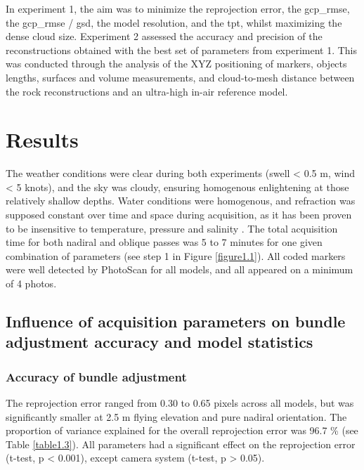 In experiment 1, the aim was to minimize the reprojection error, the \acrshort{gcp_rmse}, the \acrshort{gcp_rmse} / \acrshort{gsd}, the model resolution, and the \acrshort{tpt}, whilst maximizing the dense cloud size. Experiment 2 assessed the accuracy and precision of the reconstructions obtained with the best set of parameters from experiment 1. This was conducted through the analysis of the XYZ positioning of markers, objects lengths, surfaces and volume measurements, and cloud-to-mesh distance between the rock reconstructions and an ultra-high in-air reference model.

\section[Results]{Results}\label{chapitre1_3}
The weather conditions were clear during both experiments (swell < 0.5 m, wind < 5 knots), and the sky was cloudy, ensuring homogenous enlightening at those relatively shallow depths. Water conditions were homogenous, and refraction was supposed constant over time and space during acquisition, as it has been proven to be insensitive to temperature, pressure and salinity \citep{moore_underwater_1976}. The total acquisition time for both nadiral and oblique passes was 5 to 7 minutes for one given combination of parameters (see step 1 in Figure \ref{figure1.1}). All coded markers were well detected by PhotoScan for all models, and all appeared on a minimum of 4 photos.

\subsection{Influence of acquisition parameters on bundle adjustment accuracy and model statistics}\label{chapitre1_3.1}

\subsubsection{Accuracy of bundle adjustment}\label{chapitre1_3.1.1}
The reprojection error ranged from 0.30 to 0.65 pixels across all models, but was significantly smaller at 2.5 m flying elevation and pure nadiral orientation. The proportion of variance explained for the overall reprojection error was 96.7 \% (see Table \ref{table1.3}). All parameters had a significant effect on the reprojection error (t-test, p < 0.001), except camera system (t-test, p > 0.05). 


